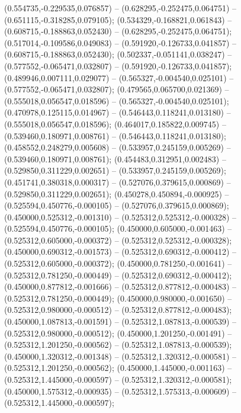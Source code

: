  (0.554735,-0.229535,0.076857) -- (0.628295,-0.252475,0.064751) -- (0.651115,-0.318285,0.079105);
 (0.534329,-0.168821,0.061843) -- (0.608715,-0.188863,0.052430) -- (0.628295,-0.252475,0.064751);
 (0.517014,-0.109586,0.049083) -- (0.591920,-0.126733,0.041857) -- (0.608715,-0.188863,0.052430);
 (0.502337,-0.051141,0.038247) -- (0.577552,-0.065471,0.032807) -- (0.591920,-0.126733,0.041857);
 (0.489946,0.007111,0.029077) -- (0.565327,-0.004540,0.025101) -- (0.577552,-0.065471,0.032807);
 (0.479565,0.065700,0.021369) -- (0.555018,0.056547,0.018596) -- (0.565327,-0.004540,0.025101);
 (0.470978,0.125115,0.014967) -- (0.546443,0.118241,0.013180) -- (0.555018,0.056547,0.018596);
 (0.464017,0.185822,0.009745) -- (0.539460,0.180971,0.008761) -- (0.546443,0.118241,0.013180);
 (0.458552,0.248279,0.005608) -- (0.533957,0.245159,0.005269) -- (0.539460,0.180971,0.008761);
 (0.454483,0.312951,0.002483) -- (0.529850,0.311229,0.002651) -- (0.533957,0.245159,0.005269);
 (0.451741,0.380318,0.000317) -- (0.527076,0.379615,0.000869) -- (0.529850,0.311229,0.002651);
 (0.450278,0.450894,-0.000925) -- (0.525594,0.450776,-0.000105) -- (0.527076,0.379615,0.000869);
 (0.450000,0.525312,-0.001310) -- (0.525312,0.525312,-0.000328) -- (0.525594,0.450776,-0.000105);
 (0.450000,0.605000,-0.001463) -- (0.525312,0.605000,-0.000372) -- (0.525312,0.525312,-0.000328);
 (0.450000,0.690312,-0.001573) -- (0.525312,0.690312,-0.000412) -- (0.525312,0.605000,-0.000372);
 (0.450000,0.781250,-0.001641) -- (0.525312,0.781250,-0.000449) -- (0.525312,0.690312,-0.000412);
 (0.450000,0.877812,-0.001666) -- (0.525312,0.877812,-0.000483) -- (0.525312,0.781250,-0.000449);
 (0.450000,0.980000,-0.001650) -- (0.525312,0.980000,-0.000512) -- (0.525312,0.877812,-0.000483);
 (0.450000,1.087813,-0.001591) -- (0.525312,1.087813,-0.000539) -- (0.525312,0.980000,-0.000512);
 (0.450000,1.201250,-0.001491) -- (0.525312,1.201250,-0.000562) -- (0.525312,1.087813,-0.000539);
 (0.450000,1.320312,-0.001348) -- (0.525312,1.320312,-0.000581) -- (0.525312,1.201250,-0.000562);
 (0.450000,1.445000,-0.001163) -- (0.525312,1.445000,-0.000597) -- (0.525312,1.320312,-0.000581);
 (0.450000,1.575312,-0.000935) -- (0.525312,1.575313,-0.000609) -- (0.525312,1.445000,-0.000597);
